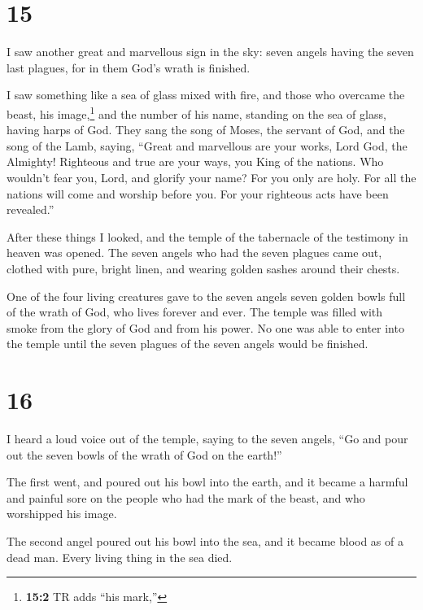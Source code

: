 \hypertarget{section-14}{%
\section{15}\label{section-14}}

 I saw another great and marvellous sign in the sky: seven
angels having the seven last plagues, for in them God's wrath is
finished.

 I saw something like a sea of glass mixed with fire, and
those who overcame the beast, his image,\footnote{\textbf{15:2} TR adds
  ``his mark,''} and the number of his name, standing on the sea of
glass, having harps of God.  They sang the song of Moses,
the servant of God, and the song of the Lamb, saying, ``Great and
marvellous are your works, Lord God, the Almighty! Righteous and true
are your ways, you King of the nations.  Who wouldn't fear
you, Lord, and glorify your name? For you only are holy. For all the
nations will come and worship before you. For your righteous acts have
been revealed.''

 After these things I looked, and the temple of the
tabernacle of the testimony in heaven was opened.  The
seven angels who had the seven plagues came out, clothed with pure,
bright linen, and wearing golden sashes around their chests.

 One of the four living creatures gave to the seven angels
seven golden bowls full of the wrath of God, who lives forever and ever.
 The temple was filled with smoke from the glory of God
and from his power. No one was able to enter into the temple until the
seven plagues of the seven angels would be finished.

\hypertarget{section-15}{%
\section{16}\label{section-15}}

 I heard a loud voice out of the temple, saying to the
seven angels, ``Go and pour out the seven bowls of the wrath of God on
the earth!''

 The first went, and poured out his bowl into the earth,
and it became a harmful and painful sore on the people who had the mark
of the beast, and who worshipped his image.

 The second angel poured out his bowl into the sea, and it
became blood as of a dead man. Every living thing in the sea died.

